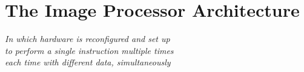 \chapter{The Image Processor Architecture}\label{ch:fpga}

\begin{flushright}{\slshape
    In which hardware is reconfigured and set up\\
    to perform a single instruction multiple times\\
    each time with different data, simultaneously
}
\end{flushright}






